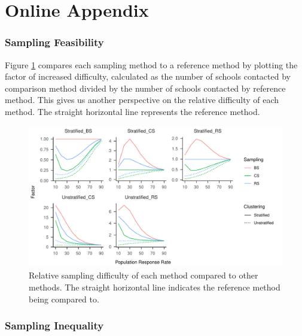 \documentclass[
  english,
  man,floatsintext]{apa6}
\begin{document}
\newpage

\hypertarget{online-appendix}{%
\section{Online Appendix}\label{online-appendix}}

\hypertarget{sampling-feasibility}{%
\subsubsection{Sampling Feasibility}\label{sampling-feasibility}}

Figure \ref{fig:fig-rel-per} compares each sampling method to a reference method by plotting the factor of increased difficulty, calculated as the number of schools contacted by comparison method divided by the number of schools contacted by reference method. This gives us another perspective on the relative difficulty of each method. The straight horizontal line represents the reference method.



\begin{figure}
\centering
\includegraphics{6---Paper_files/figure-latex/fig-rel-per-1.pdf}
\caption{\label{fig:fig-rel-per}Relative sampling difficulty of each method compared to other methods. The straight horizontal line indicates the reference method being compared to.}
\end{figure}

\hypertarget{sampling-inequality}{%
\subsubsection{Sampling Inequality}\label{sampling-inequality}}
\end{document}
